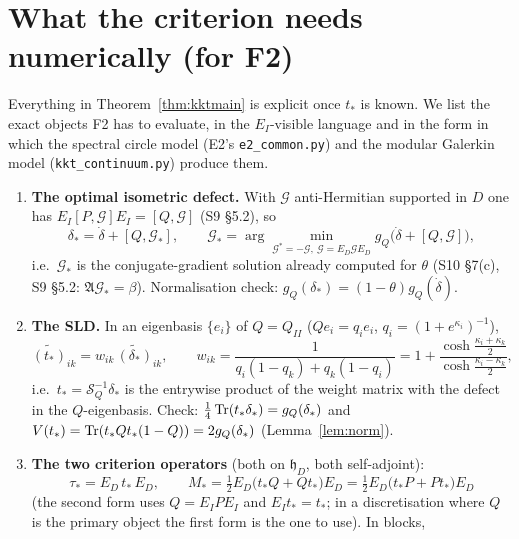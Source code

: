 \documentclass[11pt]{article}
\newcommand{\hh}{\mathfrak h}
\newcommand{\SLD}{\mathcal S_Q}
\begin{document}
\section{What the criterion needs numerically (for F2)}\label{sec:f2}


Everything in Theorem~\ref{thm:kktmain} is explicit once $t_*$ is known.  We list the exact
objects F2 has to evaluate, in the $E_I$-visible language and in the form in which the
spectral circle model (E2's \texttt{e2\_common.py}) and the modular Galerkin model
(\texttt{kkt\_continuum.py}) produce them.

\begin{enumerate}[leftmargin=1.8em,itemsep=2pt]
\item \textbf{The optimal isometric defect.}  With $\mathcal G$ anti-Hermitian supported in
 $D$ one has $E_I[P,\mathcal G]E_I=[Q,\mathcal G]$ (S9 \S5.2), so
 \begin{equation}\label{eq:f2delta}
  \delta_*=\dot\delta+[Q,\mathcal G_*],\qquad
  \mathcal G_*=\arg\min_{\mathcal G^*=-\mathcal G,\ \mathcal G=E_D\mathcal GE_D}
   g_Q\bigl(\dot\delta+[Q,\mathcal G]\bigr),
 \end{equation}
 i.e.\ $\mathcal G_*$ is the conjugate-gradient solution already computed for $\theta$
 (S10 \S7(c), S9 \S5.2: $\mathfrak A\mathcal G_*=\beta$).  Normalisation check:
 $g_Q(\delta_*)=(1-\theta)g_Q(\dot\delta)$.
\item \textbf{The SLD.}  In an eigenbasis $\{e_i\}$ of $Q=Q_{II}$ ($Qe_i=q_ie_i$,
 $q_i=(1+e^{\kappa_i})^{-1}$),
 \begin{equation}\label{eq:f2sld}
  \widetilde{(t_*)}_{ik}=w_{ik}\,\widetilde{(\delta_*)}_{ik},\qquad
  w_{ik}=\frac1{q_i(1-q_k)+q_k(1-q_i)}=1+\frac{\cosh\frac{\kappa_i+\kappa_k}2}{\cosh\frac{\kappa_i-\kappa_k}2},
 \end{equation}
 i.e.\ $t_*=\SLD^{-1}\delta_*$ is the entrywise product of the weight matrix with the
 defect in the $Q$-eigenbasis.  Check: $\frac14\operatorname{Tr}(t_*\delta_*)=g_Q(\delta_*)$ and
 $V(t_*)=\operatorname{Tr}(t_*Qt_*(1-Q))=2g_Q(\delta_*)$ (Lemma~\ref{lem:norm}).
\item \textbf{The two criterion operators} (both on $\hh_D$, both self-adjoint):
 \begin{equation}\label{eq:f2M}
  \boxed{\ \tau_*=E_D\,t_*\,E_D,\qquad
  M_*=\tfrac12E_D\bigl(t_*Q+Qt_*\bigr)E_D=\tfrac12E_D\bigl(t_*P+Pt_*\bigr)E_D\ }
 \end{equation}
 (the second form uses $Q=E_IPE_I$ and $E_It_*=t_*$; in a discretisation where $Q$ is the
 primary object the first form is the one to use).  In blocks,

\end{enumerate}
\end{document}
